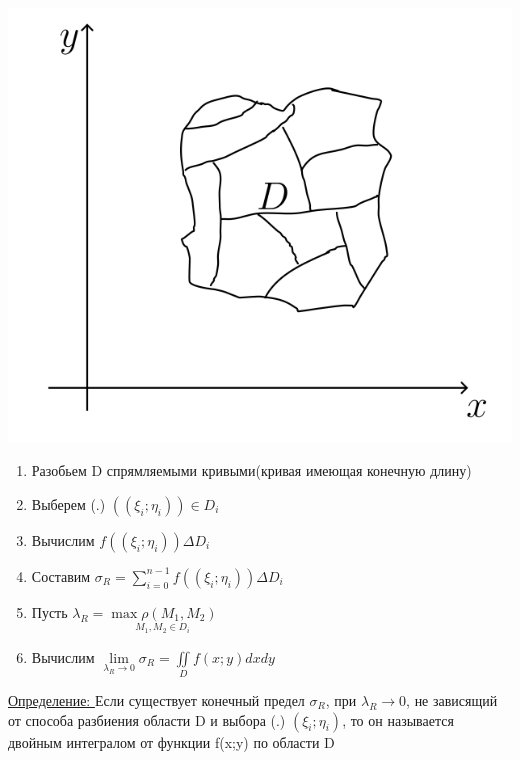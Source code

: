 \documentclass[12pt]{article}
\let\ORIincludegraphics\includegraphics
\renewcommand{\includegraphics}[2][]{\ORIincludegraphics[scale=0.65,#1]{#2}}
\let\oldiint\iint
\let\oldsum\sum
\let\oldlim\lim
\renewcommand{\iint}{\oldiint\limits}
\renewcommand{\sum}{\oldsum\limits}
\renewcommand{\lim}{\oldlim\limits}
\begin{document}
  \begin{minipage}{0.45\textwidth}
    \includegraphics[scale=0.6]{8.12.2.png}
  \end{minipage}
  \hspace{1em}
  \begin{minipage}{0.55\textwidth}
    \begin{enumerate}
      \item Разобьем D спрямляемыми кривыми(кривая имеющая конечную длину)
      \item Выберем (.) $((\xi_i;\eta_i)) \in D_i$
      \item Вычислим $f((\xi_i;\eta_i))\Delta D_i$
      \item Составим $\sigma_R=\sum_{i=0}^{n-1}f((\xi_i;\eta_i))\Delta D_i$
      \item Пусть $\lambda_R = \underset{M_1,M_2 \in D_i}{\max \rho(M_1,M_2)}$
      \item Вычислим $\lim_{\lambda_R \to 0}\sigma_R=\iint_{D}f(x;y)dxdy$
    \end{enumerate}
  \end{minipage}
  \vspace{1em}
  \break
  \underline{Определение: } Если существует конечный предел $\sigma_R$, при $\lambda_R \to 0$, не
  зависящий от способа разбиения области D и выбора (.) $(\xi_i;\eta_i)$, то он называется двойным
  интегралом от функции f(x;y) по области D\\
\end{document}
